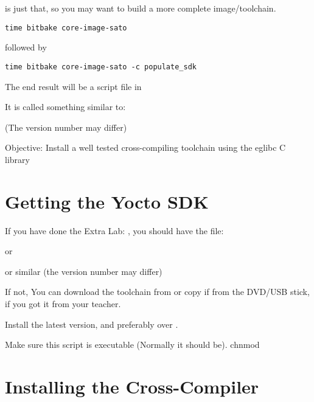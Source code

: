  is just that, so you may want to build
a more complete image/toolchain.

\begin{verbatim}
time bitbake core-image-sato
\end{verbatim}

followed by

\begin{verbatim}
time bitbake core-image-sato -c populate_sdk
\end{verbatim}
 
The end result will be a script file in 

It is called something similar to:


(The version number may differ)

  {Objective: Install a well tested cross-compiling toolchain using the eglibc C
  library}

\section{Getting the Yocto SDK}

If you have done the Extra Lab: , 
you should have the file:


or


or similar (the version number may differ)

If not, You can download the toolchain from 
or copy if from the DVD/USB stick, if you got it from your teacher.

Install the latest version, and preferably  over .

Make sure this script is executable (Normally it should be).
chnmod
\section{Installing the Cross-Compiler}


